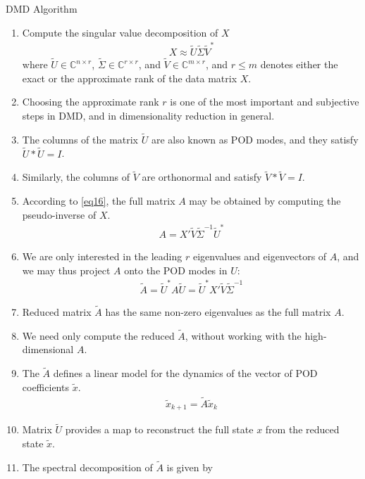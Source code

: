 \documentclass[hyperref={pdfpagemode=FullScreen},aspectratio=169]{beamer}
\begin{document}
\begin{frame}[allowframebreaks]{DMD Algorithm}
\begin{enumerate}
\setlength\itemsep{1em}
\item Compute the singular value decomposition of $X$
\begin{align}
X\approx \tilde{U}\tilde{\Sigma}\tilde{V}^*
\end{align}
where $\tilde{U} \in \mathbb{C}^{n\times r}$, $\tilde{\Sigma} \in \mathbb{C}^{r\times r}$, and $\tilde{V} \in \mathbb{C}^{m\times r}$, and $r\leq m$ denotes either the exact or the approximate rank of the data matrix $X$.
\item[] Choosing the approximate rank $r$ is one of the most important and subjective steps in DMD, and in dimensionality reduction in general.
\item[] The columns of the matrix $\tilde{U}$ are also known as POD modes, and they satisfy $\tilde{U}*\tilde{U}=I$.
\item[] Similarly, the columns of $\tilde{V}$ are orthonormal and satisfy $\tilde{V}*\tilde{V}=I$.
\item According to \cref{eq16}, the full matrix $A$ may be obtained by computing the pseudo-inverse of $X$.
\begin{align}
A=X'\tilde{V}\tilde{\Sigma}^{-1}\tilde{U}^*
\end{align}
\item[] We are only interested in the leading $r$ eigenvalues and eigenvectors of $A$, and we may thus project $A$ onto the POD modes in $U$:
\begin{align}
\tilde{A}=\tilde{U}^*A\tilde{U} = \tilde{U}^*X'\tilde{V}\tilde{\Sigma}^{-1}
\end{align}
\item[] Reduced matrix $\tilde{A}$ has the same non-zero eigenvalues as the full matrix $A$.
\item[] We need only compute the reduced $\tilde{A}$, without working with the high-dimensional $A$.
\item[] The $\tilde{A}$ defines a linear model for the dynamics of the vector of POD coefficients $\tilde{x}$.
\begin{align}
\tilde{x}_{k+1} = \tilde{A}\tilde{x}_k
\end{align}
\item[] Matrix $\tilde{U}$ provides a map to reconstruct the full state $x$ from the reduced state $\tilde{x}$.
\item The spectral decomposition of $\tilde{A}$ is given by

\end{enumerate}
\end{frame}
\end{document}
